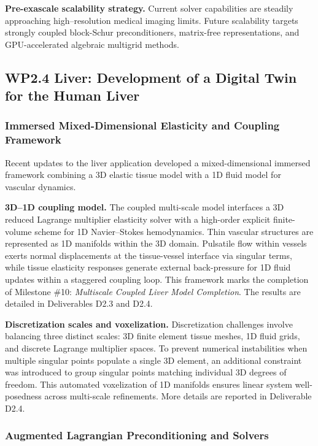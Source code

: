 \documentclass[a4paper,12pt, numbers]{article}
\begin{document}
\noindent\textbf{Pre-exascale scalability strategy.}
Current solver capabilities are steadily approaching high--resolution medical imaging limits. Future scalability targets strongly coupled block-Schur preconditioners, matrix-free representations, and GPU-accelerated algebraic multigrid methods. 

\subsection{WP2.4 Liver: Development of a Digital Twin for the Human Liver}

\subsubsection*{Immersed Mixed-Dimensional Elasticity and Coupling Framework}

\noindent Recent updates to the liver application developed a mixed-dimensional immersed framework combining a 3D elastic tissue model with a 1D fluid model for vascular dynamics.

\noindent\textbf{3D--1D coupling model.}
The coupled multi-scale model interfaces a 3D reduced Lagrange multiplier elasticity solver with a high-order explicit finite-volume scheme for 1D Navier--Stokes hemodynamics. Thin vascular structures are represented as 1D manifolds within the 3D domain. Pulsatile flow within vessels exerts normal displacements at the tissue-vessel interface via singular terms, while tissue elasticity responses generate external back-pressure for 1D fluid updates within a staggered coupling loop. This framework marks the completion of Milestone \#10: \emph{Multiscale Coupled Liver Model Completion}. The results are detailed in Deliverables D2.3 and D2.4.

\noindent\textbf{Discretization scales and voxelization.}
Discretization challenges involve balancing three distinct scales: 3D finite element tissue meshes, 1D fluid grids, and discrete Lagrange multiplier spaces. To prevent numerical instabilities when multiple singular points populate a single 3D element, an additional constraint was introduced to group singular points matching individual 3D degrees of freedom. This automated voxelization of 1D manifolds ensures linear system well-posedness across multi-scale refinements. More details are reported in Deliverable D2.4.

\subsubsection*{Augmented Lagrangian Preconditioning and Solvers}
\end{document}

